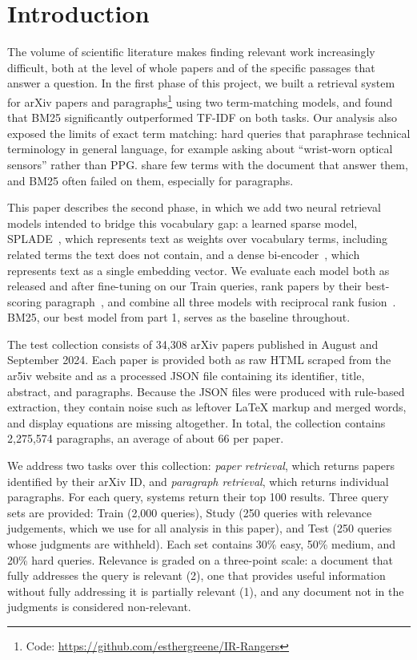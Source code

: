 \documentclass[sigconf,nonacm]{acmart}
\begin{document}
\section{Introduction}
The volume of scientific literature makes finding relevant work increasingly 
difficult, both at the level of whole papers and of the specific passages 
that answer a question. In the first phase of this project, we built a retrieval 
system for arXiv papers and paragraphs\footnote{Code: \url{https://github.com/esthergreene/IR-Rangers}} 
using two term-matching models, and found that BM25 significantly outperformed 
TF-IDF on both tasks. Our analysis also exposed the limits of exact term matching: 
hard queries that paraphrase technical terminology in general language, for 
example asking about ``wrist-worn optical sensors'' rather than PPG. share few 
terms with the document that answer them, and BM25 often failed on them, especially 
for paragraphs.

This paper describes the second phase, in which we add two neural retrieval models 
intended to bridge this vocabulary gap: a learned sparse model, SPLADE~\cite{formal2021splade}, 
which represents text as weights over vocabulary terms, including related terms the 
text does not contain, and a dense bi-encoder~\cite{reimers2019sentence}, which 
represents text as a single embedding vector. We evaluate each model both as released 
and after fine-tuning on our Train queries, rank papers by their best-scoring 
paragraph~\cite{dai2019deeper}, and combine all three models with reciprocal rank 
fusion~\cite{cormack2009reciprocal}. BM25, our best model from part 1, serves as the 
baseline throughout.

The test collection consists of 34,308 arXiv papers published in August and September 2024. 
Each paper is provided both as raw HTML scraped from the ar5iv website and as a 
processed JSON file containing its identifier, title, abstract, and paragraphs. 
Because the JSON files were produced with rule-based extraction, they contain noise 
such as leftover \LaTeX{} markup and merged words, and display equations are missing 
altogether. In total, the collection contains 2,275,574 paragraphs, an average 
of about 66 per paper.

We address two tasks over this collection: \emph{paper retrieval}, which returns 
papers identified by their arXiv ID, and \emph{paragraph retrieval}, which returns 
individual paragraphs. For each query, systems return their top 100 results. Three 
query sets are provided: Train (2,000 queries), Study (250 queries with relevance 
judgements, which we use for all analysis in this paper), and Test (250 queries 
whose judgments are withheld). Each set contains 30\% easy, 50\% medium, and 20\% 
hard queries. Relevance is graded on a three-point scale: a document that fully 
addresses the query is relevant (2), one that provides useful information without 
fully addressing it is partially relevant (1), and any document not in the judgments 
is considered non-relevant.
\end{document}
